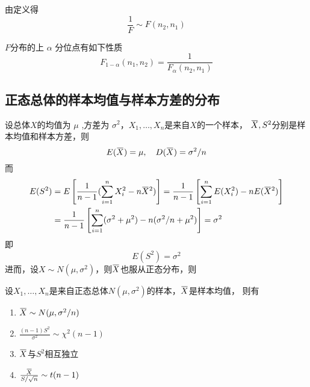 \documentclass[11pt]{article}
\begin{document}
由定义得
\begin{equation*}
\frac{1}{F}\sim F(n_2,n_1)
\end{equation*}


\(F\)分布的上 \(\alpha\) 分位点有如下性质
\begin{equation*}
F_{1-\alpha}(n_1,n_2)=\frac{1}{F_\alpha(n_2,n_1)}
\end{equation*}

\subsection{正态总体的样本均值与样本方差的分布}
\label{sec:org647007a}
设总体\(X\)的均值为 \(\mu\) ,方差为 \(\sigma^2\)，\(X_1,\dots,X_n\)是来自\(X\)的一个样本，
\(\bbar{X},S^2\)分别是样本均值和样本方差，则
\begin{equation*}
E(\bbar{X})=\mu,\quad D(\bbar{X})=\sigma^2/n
\end{equation*}
而
\begin{align*}
E(S^2)&=E\left[\frac{1}{n-1}(\sum_{i=1}^nX_i^2-n\bbar{X}^2)
\right]=\frac{1}{n-1}\left[\sum_{i=1}^nE(X_i^2)-nE(\bbar{X}^2)
\right]\\
&=\frac{1}{n-1}\left[\sum_{i=1}^n(\sigma^2+\mu^2)-n(\sigma^2/n+\mu^2)
\right]=\sigma^2
\end{align*}
即
\begin{equation*}
E(S^2)=\sigma^2
\end{equation*}
进而，设\(X\sim N(\mu,\sigma^2)\)，则\(\bbar{X}\)也服从正态分布，则
\begin{theorem}[]
\label{thm6.3.3}
设\(X_1,\dots,X_n\)是来自正态总体\(N(\mu,\sigma^2)\)的样本，\(\bbar{X}\)是样本均值，
则有
\begin{enumerate}
\item \(\bbar{X}\sim N(\mu,\sigma^2/n)\)
\item \(\frac{(n-1)S^2}{\sigma^2}\sim\chi^2(n-1)\)
\item \(\bbar{X}\)与\(S^2\)相互独立
\item \(\frac{\bbar{X}}{S/\sqrt{n}}\sim t(n-1)\)
\end{enumerate}
\end{theorem}
\end{document}
